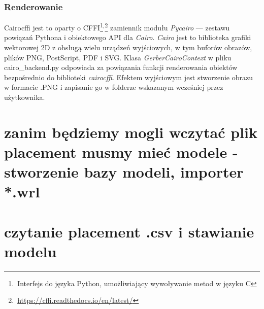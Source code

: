 \documentclass[brudnopis]{xmgr}
\begin{document}
\subsubsection{Renderowanie}
Cairocffi jest to oparty o CFFI\footnote{\,Interfejs do języka Python, umożliwiający wywoływanie metod w języku C}$^{,}$\footnote{\,\url{https://cffi.readthedocs.io/en/latest/}} zamiennik modułu \emph{Pycairo} --- zestawu powiązań Pythona i obiektowego API dla \emph{Cairo}. \emph{Cairo} jest to biblioteka grafiki wektorowej 2D z obsługą wielu urządzeń wyjściowych, w tym buforów obrazów, plików PNG, PostScript, PDF i SVG. 
Klasa \emph{GerberCairoContext} w pliku cairo\_backend.py odpowiada za powiązania funkcji renderowania obiektów bezpośrednio do biblioteki \emph{cairocffi}. Efektem wyjściowym jest stworzenie obrazu w formacie .PNG i zapisanie go w folderze wskazanym wcześniej przez użytkownika.


\section {zanim będziemy mogli wczytać plik placement musmy mieć modele - stworzenie bazy modeli, importer *.wrl\label{wrl}}


\section {czytanie placement .csv i stawianie modelu}
\end{document}
